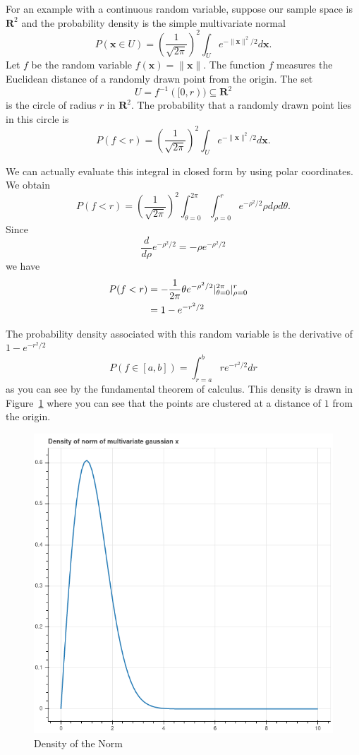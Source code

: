 \documentclass[
  11pt,
  letterpaper,
]{scrbook}
\theoremstyle{plain}
\theoremstyle{plain}
\theoremstyle{remark}
\begin{document}
For an example with a continuous random variable, suppose our sample
space is \(\mathbf{R}^{2}\) and the probability density is the simple
multivariate normal \[
P(\mathbf{x}\in U) = \left(\frac{1}{\sqrt{2\pi}}\right)^2\int_{U} e^{-\|\mathbf{x}\|^2/2} d\mathbf{x}.
\] Let \(f\) be the random variable \(f(\mathbf{x})=\|\mathbf{x}\|\).
The function \(f\) measures the Euclidean distance of a randomly drawn
point from the origin. The set
\[U=f^{-1}([0,r))\subseteq\mathbf{R}^{2}\] is the circle of radius \(r\)
in \(\mathbf{R}^{2}\). The probability that a randomly drawn point lies
in this circle is \[
P(f<r) = \left(\frac{1}{\sqrt{2\pi}}\right)^2\int_{U} e^{-\|\mathbf{x}\|^2/2} d\mathbf{x}.
\]

We can actually evaluate this integral in closed form by using polar
coordinates. We obtain \[
P(f<r) = \left(\frac{1}{\sqrt{2\pi}}\right)^2\int_{\theta=0}^{2\pi}\int_{\rho=0}^{r} e^{-\rho^2/2}\rho d\rho d\theta.
\] Since \[
\frac{d}{d\rho}e^{-\rho^2/2}=-\rho e^{-\rho^2/2}
\] we have \begin{align*}
P(f<r)&=-\frac{1}{2\pi}\theta e^{-\rho^2/2}|_{\theta=0}^{2\pi}|_{\rho=0}^{r}\cr
&=1-e^{-r^2/2}\cr
\end{align*}

The probability density associated with this random variable is the
derivative of \(1-e^{-r^2/2}\) \[
P(f\in [a,b])=\int_{r=a}^{b} re^{-r^2/2} dr
\] as you can see by the fundamental theorem of calculus. This density
is drawn in Figure~\ref{fig-maxwell} where you can see that the points
are clustered at a distance of \(1\) from the origin.

\begin{figure}

{\centering \includegraphics{chapters/img/maxwell.png}

}

\caption{\label{fig-maxwell}Density of the Norm}

\end{figure}
\end{document}
